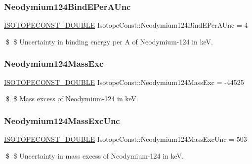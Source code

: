\subsubsection{\texorpdfstring{Neodymium124\+Bind\+E\+Per\+A\+Unc}{Neodymium124BindEPerAUnc}}
{\footnotesize\ttfamily \mbox{\hyperlink{group___isotope_const-_macros_ga8f45a7272ce02c0b4c65c44636ed719a}{I\+S\+O\+T\+O\+P\+E\+C\+O\+N\+S\+T\+\_\+\+D\+O\+U\+B\+LE}} Isotope\+Const\+::\+Neodymium124\+Bind\+E\+Per\+A\+Unc = 4}

\$ \$ Uncertainty in binding energy per A of Neodymium-\/124 in keV. \mbox{\label{group___isotope_const-_neodymium-_nd124_ga18225352a4bdc79aad89f81890fe0c92}} 
\subsubsection{\texorpdfstring{Neodymium124\+Mass\+Exc}{Neodymium124MassExc}}
{\footnotesize\ttfamily \mbox{\hyperlink{group___isotope_const-_macros_ga8f45a7272ce02c0b4c65c44636ed719a}{I\+S\+O\+T\+O\+P\+E\+C\+O\+N\+S\+T\+\_\+\+D\+O\+U\+B\+LE}} Isotope\+Const\+::\+Neodymium124\+Mass\+Exc = -\/44525}

\$ \$ Mass excess of Neodymium-\/124 in keV. \mbox{\label{group___isotope_const-_neodymium-_nd124_gaf2e45c8b79017248d883bd6d7e7da0d6}} 
\subsubsection{\texorpdfstring{Neodymium124\+Mass\+Exc\+Unc}{Neodymium124MassExcUnc}}
{\footnotesize\ttfamily \mbox{\hyperlink{group___isotope_const-_macros_ga8f45a7272ce02c0b4c65c44636ed719a}{I\+S\+O\+T\+O\+P\+E\+C\+O\+N\+S\+T\+\_\+\+D\+O\+U\+B\+LE}} Isotope\+Const\+::\+Neodymium124\+Mass\+Exc\+Unc = 503}

\$ \$ Uncertainty in mass excess of Neodymium-\/124 in keV. \mbox{\label{group___isotope_const-_neodymium-_nd124_gab77ceed1f518d3d5a51c6ca1906dd487}} 
